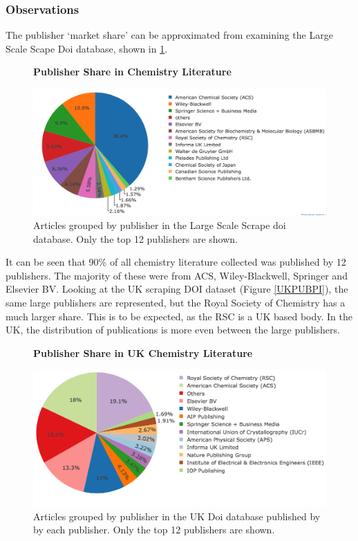 \subsubsection{Observations}
\label{sec:CORPUSOBSERVATIONS}
The publisher `market share' can be approximated from examining the Large Scale Scape Doi database, shown in \ref{fig:PUBPI}. 
\begin{figure}[H]
    \centering
    \textbf{Publisher Share in Chemistry Literature}\par\medskip
    \includegraphics[scale=0.4]{Data_Acquisition/publishers_pie.png}
    \caption{Articles grouped by publisher in the Large Scale Scrape doi database. Only the top 12 publishers are shown.}
     \label{fig:PUBPI}
\end{figure}
It can be seen that 90\% of all chemistry literature collected was published by 12 publishers. The majority of these were from ACS, Wiley-Blackwell, Springer and Elsevier BV. Looking at the UK scraping DOI dataset (Figure \ref{UKPUBPI}), the same large publishers are represented, but the Royal Society of Chemistry has a much larger share. This is to be expected, as the RSC is a UK based body. In the UK, the distribution of publications is more even between the large publishers. 

\begin{figure}[H]
    \centering
    \textbf{Publisher Share in UK Chemistry Literature}\par\medskip
    \includegraphics[scale=0.4]{Data_Acquisition/uk_publishers_pie.png}
    \caption{Articles grouped by publisher in the UK Doi database published by by each publisher. Only the top 12 publishers are shown.}
     \label{fig:UKPUBPI}
\end{figure}

